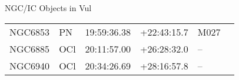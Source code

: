 \begin{block}{NGC/IC Objects in Vul}
  \centering
  \begin{tabularx}{\textwidth}{llrrll} 
    NGC6853 & PN & 19:59:36.38 & +22:43:15.7  & M027 \\ 
    NGC6885 & OCl & 20:11:57.00 & +26:28:32.0  & -- \\ 
    NGC6940 & OCl & 20:34:26.69 & +28:16:57.8  & -- \\ 
  \end{tabularx}
\end{block}
